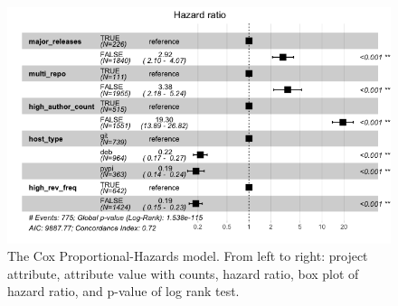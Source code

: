 \documentclass[sigconf]{acmart}
\begin{document}
\begin{figure}
    \centering
    \includegraphics[scale=0.45, keepaspectratio=true]{img/CoxHR-table.jpg}
    \caption{The Cox Proportional-Hazards model. From left to right: project attribute, attribute value with counts, hazard ratio, box plot of hazard ratio, and p-value of log rank test.}
    \label{fig:Cox}
\end{figure}
\end{document}
